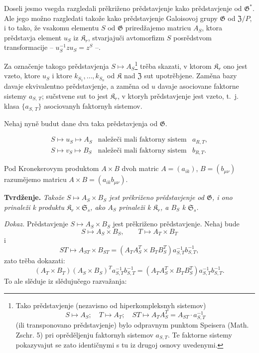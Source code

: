 \documentclass[11pt]{article}
\newcommand{\srcfn}[2]{\footnote{#2}}
\begin{document}
Doseli jesmo vsegda razgledali prěkriženo prědstavjenje kako prědstavjenje od \(\mathfrak{G}^*\). Ale jego možno razgledati takože kako prědstavjenje Galoisovoj grupy \(\mathfrak{G}\) od \(\mathfrak Z/P\), i to tako, že vsakomu elementu \(S\) od \(\mathfrak{G}\) priredžajemo matricu \(A_S\), ktora prědstavja element \(u_S\) iz \(\mathfrak K_r\), stvarjajuči avtomorfizm \(S\) posrědstvom transformacije -- \(u_S^{-1}zu_S=z^S\) --.

Za označenje takogo prědstavjenja \(S\mapsto A_S\)\srcfn{1}{Tako prědstavjenje (nezavisno od hiperkompleksnyh sistemov)
\[
S\mapsto A_S;\quad T\mapsto A_T;\quad ST\mapsto A_TA_S^T=A_{ST}\cdot a_{S,T}^{-1}
\]
(ili transponovano prědstavjenje) bylo odpravnym punktom Speisera (Math. Zschr. 5) pri oprěděljenju faktornyh sistemov \(a_{S,T}\). Te faktorne sistemy pokazyvajut se zato identičnymi s tu iz drugoj osnovy uvedenymi.} trěba skazati, v ktorom \(\mathfrak K_r\) ono jest vzeto, ktore \(u_S\) i ktore \(k_{S_1},\ldots,k_{S_n}\) od \(\mathfrak K\) nad \(\mathfrak Z\) sut upotrěbjene. Zaměna bazy davaje ekvivalentno prědstavjenje, a zaměna od \(u\) davaje asociovane faktorne sistemy \(a_{S,\,T}\); sučstvene sut to jest \(\mathfrak K_r\), v ktoryh prědstavjenje jest vzeto, t.~j. klasa \(\{a_{S,\,T}\}\) asociovanyh faktornyh sistemov.

Nehaj nyně budut dane dva taka prědstavjenja od \(\mathfrak G\).

\[
\begin{array}{lll}
S\mapsto u_S\mapsto A_S & \text{naležeči mali faktorny sistem} & a_{R,T},\\
S\mapsto v_S\mapsto B_S & \text{naležeči mali faktorny sistem} & b_{R,T}.
\end{array}
\]

Pod Kronekerovym produktom \(A\times B\) dvoh matric \(A=(a_{ik})\), \(B=(b_{\mu\nu})\) razumějemo matricu \(A\times B=(a_{ik}b_{\mu\nu})\).

\noindent\textbf{Tvrdženje.} \emph{Takože \(S\mapsto A_S\times B_S\) jest prěkriženo prědstavjenje od \(\mathfrak G\), i ono prinaleži k produktu \(\mathfrak K_r\times\mathfrak S_s\), ako \(A_S\) prinaleži k \(\mathfrak K_r\), a \(B_S\) k \(\mathfrak S_s\).}

\noindent\emph{Dokaz.} Prědstavjenje \(S\mapsto A_S\times B_S\) jest prěkriženo prědstavjenje. Nehaj bude
\[
S\mapsto A_S\times B_S,\qquad T\mapsto A_T\times B_T
\]
i
\[
ST\mapsto A_{ST}\times B_{ST}
=(A_TA_S^T\times B_TB_S^T)a_{S,T}^{-1}b_{S,T}^{-1},
\]
zato trěba dokazati:
\[
(A_T\times B_T)(A_S\times B_S)^T a_{S,T}^{-1}b_{S,T}^{-1}
=(A_TA_S^T\times B_TB_S^T)a_{S,T}^{-1}b_{S,T}^{-1}.
\]
To ale slěduje iz slědujučego razvažanja:
\end{document}
